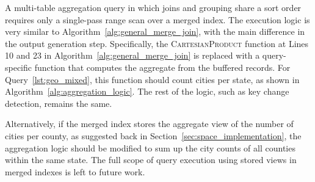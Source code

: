 \documentclass[sigconf, pdfa, nonacm]{acmart}
\begin{document}
A multi-table aggregation query in which joins and grouping share a sort order requires only a single-pass range scan over a merged index. The execution logic is very similar to Algorithm~\ref{alg:general_merge_join}, with the main difference in the output generation step.
Specifically, the \textsc{CartesianProduct} function at Lines 10 and 23 in Algorithm~\ref{alg:general_merge_join} is replaced with a query-specific function that computes the aggregate from the buffered records.
For Query~\ref{lst:geo_mixed}, this function should count cities per state, as shown in Algorithm~\ref{alg:aggregation_logic}. The rest of the logic, such as key change detection, remains the same.


Alternatively, if the merged index stores the aggregate view of the number of cities per county, as suggested back in Section~\ref{sec:space_implementation}, the aggregation logic should be modified to sum up the city counts of all counties within the same state. 
The full scope of query execution using stored views in merged indexes is left to future work.
\end{document}
